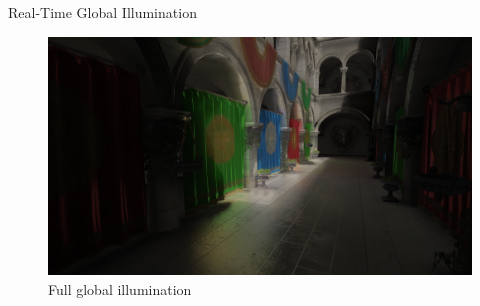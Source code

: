 \documentclass[10pt]{beamer}
\begin{document}
\begin{frame}{Real-Time Global Illumination}
  \begin{figure}
    \includegraphics[width=\textwidth]{gi_on.png}
    \caption*{Full global illumination}
  \end{figure}
\end{frame}


\end{document}
